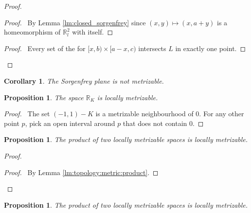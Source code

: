 \documentclass{report}
\let\qed\relax
\newtheorem{prop}[lm]{Proposition}
\newtheorem{cor}{Corollary}[lm]
\theoremstyle{definition}
\begin{document}
 \begin{proof}
  \pf
  \step{<1>2}{\pick\ $a > 0$ such that $[0,a)^2 \subseteq U$}
  \begin{proof}
    \pf\ By Lemma \ref{lm:closed_sorgenfrey} since $(x,y) \mapsto (x,a+y)$ is
    a homeomorphism of $\mathbb{R}_l^2$ with itself.
  \end{proof}
  \step{<1>5}{\pflet{$\mathcal{U} = \{ U \setminus L \} \cup \{ ([x,b) \times
      [a-x,c)) \cap U : b > a, c > a - x \}$}}
  \begin{proof}
    \pf\ Every set of the for $[x,b) \times [a-x,c)$ intersects $L$ in exactly
one point.
  \end{proof}
  \qed
 \end{proof}

 \begin{cor}
  The Sorgenfrey plane is not metrizable.
 \end{cor}

\begin{prop}
  The space $\mathbb{R}_K$ is locally metrizable.
\end{prop}

\begin{proof}
 \pf\ The set $(-1, 1) - K$ is a metrizable neighbourhood of 0. For any other
point $p$, pick an open interval around $p$ that does not contain 0. \qed
\end{proof}
\begin{prop}
  The product of two locally metrizable spaces is locally metrizable.
\end{prop}

\begin{proof}
  \pf
  \begin{proof}
    \pf\ By Lemma \ref{lm:topology:metric:product}.
  \end{proof}
  \qed
\end{proof}


\begin{prop}
  The product of two locally metrizable spaces is locally metrizable.
\end{prop}
\end{document}
